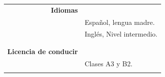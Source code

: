 \documentclass[a4paper,10pt, sans]{article}
\begin{document}
\begin{table}[H]
\begin{tabularx}{\textwidth}{r X}
    \textbf{Idiomas} & {} \\ [1ex]
    {} & Español, lengua madre. \\ [1ex]
    {} & Inglés, Nivel intermedio. \\ \\ \hline \\
      
    \textbf{Licencia de conducir} & {} \\ [1ex]
    {} & Clases A3 y B2.\\
    
\vspace{5cm}
    
    
    
    
        
  \end{tabularx}
  \end{table}
  
\end{document}
